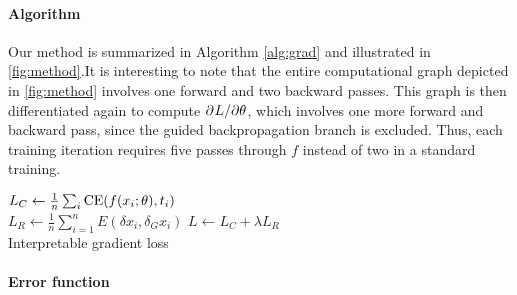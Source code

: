 \paragraph{Algorithm}
Our method is summarized in Algorithm \ref{alg:grad} %
and illustrated in \ref{fig:method}.It is interesting to note that the entire computational graph depicted in \ref{fig:method} involves one forward and two backward passes. This graph is then differentiated again to compute $\partial^{}{L}/\partial{\theta^{}}$, which involves one more forward and backward pass, since the guided backpropagation branch is excluded. Thus, each training iteration requires five passes through $f$ instead of two in a standard training.
\begin{algorithm}[t]
	\newcommand{\commentsty}[1]{{\color{DarkGreen}#1}}


	$L_C \gets \frac{1}{n} \sum_i \operatorname{CE}(f(x_i; \theta), t_i)$  \\
   $L_R \gets \frac{1}{n} \sum_{i=1}^n E(\delta x_i, \delta_G x_i) $ 
 $L \gets L_C + \lambda L_R$ 
  \\

\caption{Interpretable gradient loss}
\label{alg:grad}
\end{algorithm}




\paragraph{Error function}

